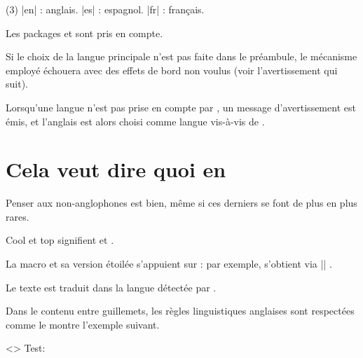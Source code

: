 \begin{tasks}[label=\small\textbullet](3)
    \task \tdoclatexin|en| : anglais.
        \task \tdoclatexin|es| : espagnol.
        \task \tdoclatexin|fr| : français.
\end{tasks}
                    


\begin{tdocnote}
    Les packages  et  sont pris en compte.
\end{tdocnote}


\begin{tdoccaut}
    Si le choix de la langue principale n'est pas faite dans le préambule, le mécanisme employé échouera avec des effets de bord non voulus (voir l'avertissement qui suit).
\end{tdoccaut}


\begin{tdocwarn}
    Lorsqu'une langue n'est pas prise en compte par \thisproj, un message d'avertissement est émis, et l'anglais est alors choisi comme langue vis-à-vis de \thisproj.
\end{tdocwarn}


\section{Cela veut dire quoi en }

Penser aux non-anglophones est bien, même si ces derniers se font de plus en plus rares.

\begin{tdoclatex}
Cool et top signifient  et .
\end{tdoclatex}


La macro  et sa version étoilée s'appuient sur  : par exemple,  s'obtient via \tdoclatexin|| .


\begin{tdocnote}
    Le texte  est traduit dans la langue détectée par \thisproj.
\end{tdocnote}


Dans le contenu entre guillemets, les règles linguistiques anglaises sont respectées comme le montre l'exemple suivant.

\begin{tdoclatex}<>
          Test:   \\
\end{tdoclatex}


